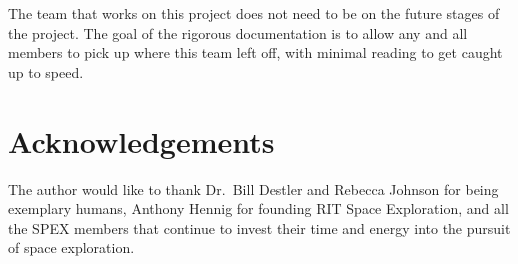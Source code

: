 \documentclass[conference]{IEEEtran} %
\begin{document}
The team that works on this project does not need to be on the future stages of the project. The goal of the rigorous documentation is to allow any and all members
to pick up where this team left off, with minimal reading to get caught up to speed.
\section*{Acknowledgements}
The author would like to thank Dr.~Bill Destler and Rebecca Johnson for being exemplary humans, Anthony Hennig for founding RIT Space Exploration, and all the SPEX members that continue to invest their time and energy into the pursuit of space exploration.

%
%

\onecolumn
\appendices{}
\end{document}
